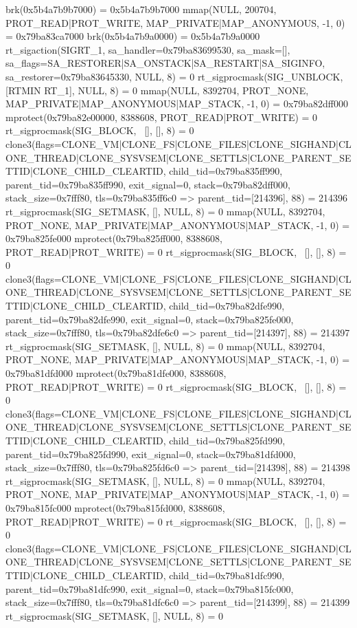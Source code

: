 \begin{breakableverbatim}
brk(0x5b4a7b9b7000)                     = 0x5b4a7b9b7000
mmap(NULL, 200704, PROT_READ|PROT_WRITE, MAP_PRIVATE|MAP_ANONYMOUS, -1, 0) = 0x79ba83ca7000
brk(0x5b4a7b9a0000)                     = 0x5b4a7b9a0000
rt_sigaction(SIGRT_1, {sa_handler=0x79ba83699530, sa_mask=[], sa_flags=SA_RESTORER|SA_ONSTACK|SA_RESTART|SA_SIGINFO, sa_restorer=0x79ba83645330}, NULL, 8) = 0
rt_sigprocmask(SIG_UNBLOCK, [RTMIN RT_1], NULL, 8) = 0
mmap(NULL, 8392704, PROT_NONE, MAP_PRIVATE|MAP_ANONYMOUS|MAP_STACK, -1, 0) = 0x79ba82dff000
mprotect(0x79ba82e00000, 8388608, PROT_READ|PROT_WRITE) = 0
rt_sigprocmask(SIG_BLOCK, ~[], [], 8)   = 0
clone3({flags=CLONE_VM|CLONE_FS|CLONE_FILES|CLONE_SIGHAND|CLONE_THREAD|CLONE_SYSVSEM|CLONE_SETTLS|CLONE_PARENT_SETTID|CLONE_CHILD_CLEARTID, child_tid=0x79ba835ff990, parent_tid=0x79ba835ff990, exit_signal=0, stack=0x79ba82dff000, stack_size=0x7fff80, tls=0x79ba835ff6c0} => {parent_tid=[214396]}, 88) = 214396
rt_sigprocmask(SIG_SETMASK, [], NULL, 8) = 0
mmap(NULL, 8392704, PROT_NONE, MAP_PRIVATE|MAP_ANONYMOUS|MAP_STACK, -1, 0) = 0x79ba825fe000
mprotect(0x79ba825ff000, 8388608, PROT_READ|PROT_WRITE) = 0
rt_sigprocmask(SIG_BLOCK, ~[], [], 8)   = 0
clone3({flags=CLONE_VM|CLONE_FS|CLONE_FILES|CLONE_SIGHAND|CLONE_THREAD|CLONE_SYSVSEM|CLONE_SETTLS|CLONE_PARENT_SETTID|CLONE_CHILD_CLEARTID, child_tid=0x79ba82dfe990, parent_tid=0x79ba82dfe990, exit_signal=0, stack=0x79ba825fe000, stack_size=0x7fff80, tls=0x79ba82dfe6c0} => {parent_tid=[214397]}, 88) = 214397
rt_sigprocmask(SIG_SETMASK, [], NULL, 8) = 0
mmap(NULL, 8392704, PROT_NONE, MAP_PRIVATE|MAP_ANONYMOUS|MAP_STACK, -1, 0) = 0x79ba81dfd000
mprotect(0x79ba81dfe000, 8388608, PROT_READ|PROT_WRITE) = 0
rt_sigprocmask(SIG_BLOCK, ~[], [], 8)   = 0
clone3({flags=CLONE_VM|CLONE_FS|CLONE_FILES|CLONE_SIGHAND|CLONE_THREAD|CLONE_SYSVSEM|CLONE_SETTLS|CLONE_PARENT_SETTID|CLONE_CHILD_CLEARTID, child_tid=0x79ba825fd990, parent_tid=0x79ba825fd990, exit_signal=0, stack=0x79ba81dfd000, stack_size=0x7fff80, tls=0x79ba825fd6c0} => {parent_tid=[214398]}, 88) = 214398
rt_sigprocmask(SIG_SETMASK, [], NULL, 8) = 0
mmap(NULL, 8392704, PROT_NONE, MAP_PRIVATE|MAP_ANONYMOUS|MAP_STACK, -1, 0) = 0x79ba815fc000
mprotect(0x79ba815fd000, 8388608, PROT_READ|PROT_WRITE) = 0
rt_sigprocmask(SIG_BLOCK, ~[], [], 8)   = 0
clone3({flags=CLONE_VM|CLONE_FS|CLONE_FILES|CLONE_SIGHAND|CLONE_THREAD|CLONE_SYSVSEM|CLONE_SETTLS|CLONE_PARENT_SETTID|CLONE_CHILD_CLEARTID, child_tid=0x79ba81dfc990, parent_tid=0x79ba81dfc990, exit_signal=0, stack=0x79ba815fc000, stack_size=0x7fff80, tls=0x79ba81dfc6c0} => {parent_tid=[214399]}, 88) = 214399
rt_sigprocmask(SIG_SETMASK, [], NULL, 8) = 0

\end{breakableverbatim}
